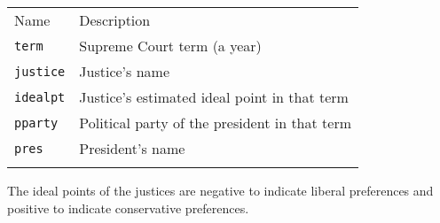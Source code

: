 \documentclass[]{article}
\begin{document}
\begin{longtable}[c]{@{}ll@{}}
\toprule\addlinespace
\begin{minipage}[b]{0.25\columnwidth}\raggedright
Name
\end{minipage} & \begin{minipage}[b]{0.68\columnwidth}\raggedright
Description
\end{minipage}
\\\addlinespace
\midrule\endhead
\begin{minipage}[t]{0.25\columnwidth}\raggedright
\texttt{term}
\end{minipage} & \begin{minipage}[t]{0.68\columnwidth}\raggedright
Supreme Court term (a year)
\end{minipage}
\\\addlinespace
\begin{minipage}[t]{0.25\columnwidth}\raggedright
\texttt{justice}
\end{minipage} & \begin{minipage}[t]{0.68\columnwidth}\raggedright
Justice's name
\end{minipage}
\\\addlinespace
\begin{minipage}[t]{0.25\columnwidth}\raggedright
\texttt{idealpt}
\end{minipage} & \begin{minipage}[t]{0.68\columnwidth}\raggedright
Justice's estimated ideal point in that term
\end{minipage}
\\\addlinespace
\begin{minipage}[t]{0.25\columnwidth}\raggedright
\texttt{pparty}
\end{minipage} & \begin{minipage}[t]{0.68\columnwidth}\raggedright
Political party of the president in that term
\end{minipage}
\\\addlinespace
\begin{minipage}[t]{0.25\columnwidth}\raggedright
\texttt{pres}
\end{minipage} & \begin{minipage}[t]{0.68\columnwidth}\raggedright
President's name
\end{minipage}
\\\addlinespace
\bottomrule
\end{longtable}

The ideal points of the justices are negative to indicate liberal
preferences and positive to indicate conservative preferences.
\end{document}
